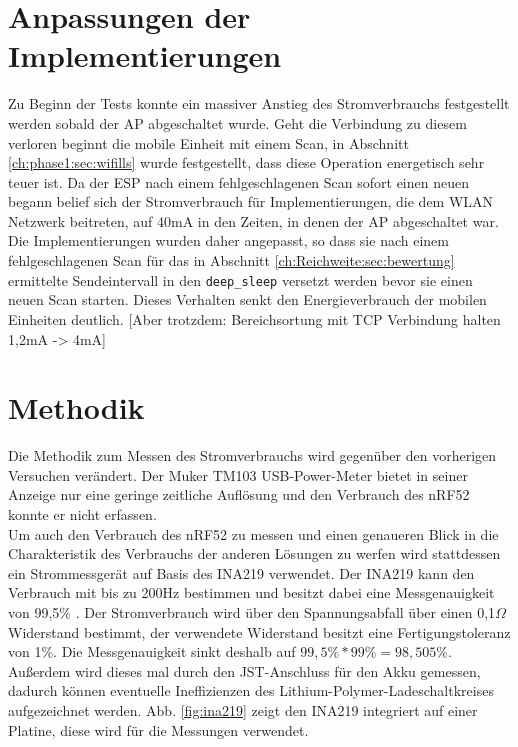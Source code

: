 \section{Anpassungen der Implementierungen}
Zu Beginn der Tests konnte ein massiver Anstieg des Stromverbrauchs festgestellt werden sobald der AP abgeschaltet wurde.
Geht die Verbindung zu diesem verloren beginnt die mobile Einheit mit einem Scan, in Abschnitt \ref{ch:phase1:sec:wifills} wurde festgestellt, dass diese Operation energetisch sehr teuer ist.
Da der ESP nach einem fehlgeschlagenen Scan sofort einen neuen begann belief sich der Stromverbrauch für Implementierungen, die dem WLAN Netzwerk beitreten, auf 40mA in den Zeiten, in denen der AP abgeschaltet war.
Die Implementierungen wurden daher angepasst, so dass sie nach einem fehlgeschlagenen Scan für das in Abschnitt \ref{ch:Reichweite:sec:bewertung} ermittelte Sendeintervall in den \texttt{deep\_sleep} versetzt werden bevor sie einen neuen Scan starten.
Dieses Verhalten senkt den Energieverbrauch der mobilen Einheiten deutlich.
[Aber trotzdem: Bereichsortung mit TCP Verbindung halten 1,2mA -> 4mA]

\section{Methodik}
Die Methodik zum Messen des Stromverbrauchs wird gegenüber den vorherigen Versuchen verändert.
Der Muker TM103 USB-Power-Meter bietet in seiner Anzeige nur eine geringe zeitliche Auflösung und den Verbrauch des nRF52 konnte er nicht erfassen.\\
Um auch den Verbrauch des nRF52 zu messen und einen genaueren Blick in die Charakteristik des Verbrauchs der anderen Lösungen zu werfen wird stattdessen ein Strommessgerät auf Basis des INA219 verwendet.
Der INA219 kann den Verbrauch mit bis zu 200Hz bestimmen und besitzt dabei eine Messgenauigkeit von 99,5\% \cite{texas2015ina}.
Der Stromverbrauch wird über den Spannungsabfall über einen 0,1$\Omega$ Widerstand bestimmt, der verwendete Widerstand besitzt eine Fertigungstoleranz von 1\%.
Die Messgenauigkeit sinkt deshalb auf $99,5\% * 99\% = 98,505\%$. \\
Außerdem wird dieses mal durch den JST-Anschluss für den Akku gemessen, dadurch können eventuelle Ineffizienzen des Lithium-Polymer-Ladeschaltkreises aufgezeichnet werden. 
Abb. \ref{fig:ina219} zeigt den INA219 integriert auf einer Platine, diese wird für die Messungen verwendet.

